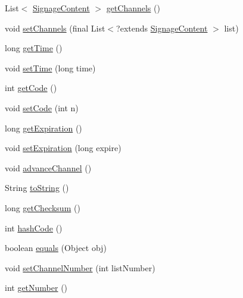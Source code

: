 \begin{DoxyCompactItemize}
\item 
List$<$ \hyperlink{interfacegov_1_1fnal_1_1ppd_1_1dd_1_1signage_1_1SignageContent}{Signage\-Content} $>$ \hyperlink{classgov_1_1fnal_1_1ppd_1_1dd_1_1channel_1_1ChannelPlayList_a4a45d0e640ddc2548f37bd6c1c997f11}{get\-Channels} ()
\item 
void \hyperlink{classgov_1_1fnal_1_1ppd_1_1dd_1_1channel_1_1ChannelPlayList_abfcd48d8d992007dd8b7afd3ea1e1dd2}{set\-Channels} (final List$<$?extends \hyperlink{interfacegov_1_1fnal_1_1ppd_1_1dd_1_1signage_1_1SignageContent}{Signage\-Content} $>$ list)
\item 
long \hyperlink{classgov_1_1fnal_1_1ppd_1_1dd_1_1channel_1_1ChannelPlayList_aeffef12153803eb9b53b8465605926a9}{get\-Time} ()
\item 
void \hyperlink{classgov_1_1fnal_1_1ppd_1_1dd_1_1channel_1_1ChannelPlayList_ac1efd270a0a6ac0c723a6cbd7d97b9a5}{set\-Time} (long time)
\item 
int \hyperlink{classgov_1_1fnal_1_1ppd_1_1dd_1_1channel_1_1ChannelPlayList_a63f0a55d5f714b9b510b5d9b52ab5294}{get\-Code} ()
\item 
void \hyperlink{classgov_1_1fnal_1_1ppd_1_1dd_1_1channel_1_1ChannelPlayList_a054421b30bfa598b9f907facbba2dc6c}{set\-Code} (int n)
\item 
long \hyperlink{classgov_1_1fnal_1_1ppd_1_1dd_1_1channel_1_1ChannelPlayList_a6af41cecbc1b1c903c5dc7544466b169}{get\-Expiration} ()
\item 
void \hyperlink{classgov_1_1fnal_1_1ppd_1_1dd_1_1channel_1_1ChannelPlayList_a6685e37b070296e6c0e68604d3d61b8a}{set\-Expiration} (long expire)
\item 
void \hyperlink{classgov_1_1fnal_1_1ppd_1_1dd_1_1channel_1_1ChannelPlayList_a98bb559bcfd42b2f26aeb2082e2e89fd}{advance\-Channel} ()
\item 
String \hyperlink{classgov_1_1fnal_1_1ppd_1_1dd_1_1channel_1_1ChannelPlayList_ab53b318aa5cdd56a200e404912c1050b}{to\-String} ()
\item 
long \hyperlink{classgov_1_1fnal_1_1ppd_1_1dd_1_1channel_1_1ChannelPlayList_a7a41f216f9725c9167dbabfe1332e0f6}{get\-Checksum} ()
\item 
int \hyperlink{classgov_1_1fnal_1_1ppd_1_1dd_1_1channel_1_1ChannelPlayList_ad4dce7869f8dc2b89c663dd40c68be7f}{hash\-Code} ()
\item 
boolean \hyperlink{classgov_1_1fnal_1_1ppd_1_1dd_1_1channel_1_1ChannelPlayList_aa117d6780ca09a5e94592efcee06cc1c}{equals} (Object obj)
\item 
void \hyperlink{classgov_1_1fnal_1_1ppd_1_1dd_1_1channel_1_1ChannelPlayList_a8fc69999aaf34ff89f285b80ebe826e0}{set\-Channel\-Number} (int list\-Number)
\item 
int \hyperlink{classgov_1_1fnal_1_1ppd_1_1dd_1_1channel_1_1ChannelPlayList_a70afc652012758cd493013f94ef22efa}{get\-Number} ()
\end{DoxyCompactItemize}



